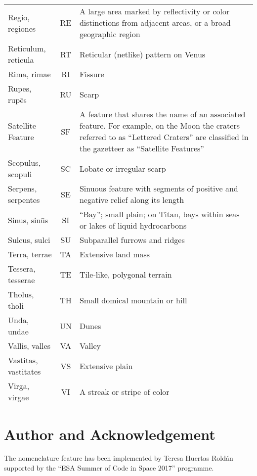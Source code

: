\begin{longtable}{l|c|p{72mm}}
Regio, regiones       & RE & A large area marked by reflectivity or color distinctions from adjacent areas, 
                             or a broad geographic region\\%
Reticulum, reticula   & RT & Reticular (netlike) pattern on Venus\\%
Rima, rimae           & RI & Fissure\\%
Rupes, rupēs          & RU & Scarp\\\midrule
Satellite Feature     & SF & A feature that shares the name of an associated feature. 
                             For example, on the Moon the craters referred to as ``Lettered Craters'' 
							 are classified in the gazetteer as ``Satellite Features''\\%
Scopulus, scopuli     & SC & Lobate or irregular scarp\\%
Serpens, serpentes    & SE & Sinuous feature with segments of positive and negative relief along its length\\%
Sinus, sinūs          & SI & ``Bay''; small plain; on Titan, bays within seas or lakes of liquid hydrocarbons\\%
Sulcus, sulci         & SU & Subparallel furrows and ridges\\\midrule
Terra, terrae         & TA & Extensive land mass\\%
Tessera, tesserae     & TE & Tile-like, polygonal terrain\\%
Tholus, tholi         & TH & Small domical mountain or hill\\\midrule
Unda, undae           & UN & Dunes\\\midrule
Vallis, valles        & VA & Valley\\%
Vastitas, vastitates  & VS & Extensive plain\\%
Virga, virgae         & VI & A streak or stripe of color\\\bottomrule
\end{longtable}


\section*{Author and Acknowledgement}
\label{sec:Nomenclature:Acknowledgments}
The nomenclature feature has been implemented by Teresa Huertas Roldán supported by the ``ESA Summer of Code in Space 2017'' programme.



